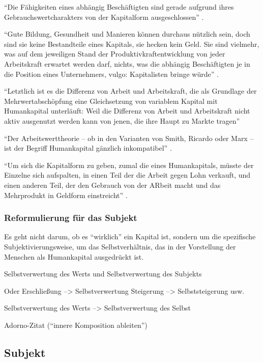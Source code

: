 \documentclass[12pt,
               DIV13,
               paper=a4,
               twoside=false,
               onehalfspacing,
               bibliography=totoc,
               toc=graduated,
               draft,
               ]{scrartcl}
\newcommand{\pc}[2]{\parencite[#1]{#2}}
\begin{document}
"`Die Fähigkeiten eines abhängig Beschäftigten sind gerade aufgrund
ihres Gebrauchswertcharakters von der Kapitalform ausgeschlossen"'
\pc{126}{strauss}.

"`Gute Bildung, Gesundheit und Manieren können durchaus nützlich sein,
doch sind sie keine Bestandteile eines Kapitals, sie hecken kein Geld.
Sie sind vielmehr, was auf dem jeweiligen Stand der
Produktivkraftentwicklung von jeder Arbeitskraft erwartet werden darf,
nichts, was die abhängig Beschäftigten je in die Position eines
Unternehmers, vulgo: Kapitalisten bringe würde"' \pc{128}{strauss}.

"`Letztlich ist es die Differenz von Arbeit und Arbeitskraft, die als
Grundlage der Mehrwertabschöpfung eine Gleichsetzung von variablem
Kapital mit Humankapital unterläuft: Weil die Differenz von Arbeit und
Arbeitskraft nicht aktiv ausgenutzt werden kann von jenen, die ihre
Haupt zu Markte tragen"' \pc{126}{strauss}

"`Der Arbeitswerttheorie -- ob in den Varianten von Smith, Ricardo
oder Marx -- ist der Begriff Humankapital gänzlich inkompatibel"'
\pc{124}{strauss}.

"`Um sich die Kapitalform zu geben, zumal die eines Humankapitals,
müsste der Einzelne sich aufspalten, in einen Teil der die Arbeit
gegen Lohn verkauft, und einen anderen Teil, der den Gebrauch von der
ARbeit macht und das Mehrprodukt in Geldform einstreicht"'
\pc{126}{strauss}.

\subsubsection{Reformulierung für das Subjekt}

Es geht nicht darum, ob es "`wirklich"' ein Kapital ist, sondern um
die spezifische Subjektivierungsweise, um das Selbstverhältnis, das in
der Vorstellung der Menschen als Humankapital ausgedrückt ist.

Selbstverwertung des Werts und Selbstverwertung des Subjekts

Oder Erschließung --> Selbstverwertung
Steigerung --> Selbststeigerung usw.

Selbstverwertung des Werts --> Selbstverwertung des Selbst

Adorno-Zitat ("`innere Komposition ableiten"')

\subsection{Subjekt}
\end{document}
